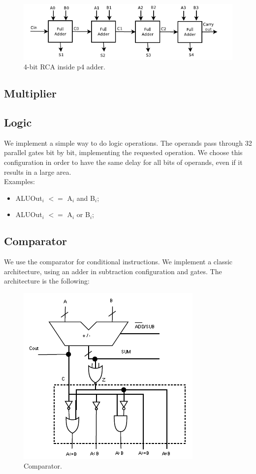 \begin{figure}[h]
\centering
\includegraphics[scale = 0.7]{chapters/figures/rca} 
\caption{4-bit RCA inside p4 adder.}
\label{fig:rca}  %
\end{figure}

\FloatBarrier

\subsection{Multiplier}



\subsection{Logic}

We implement a simple way to do logic operations. The operands pass through 32 parallel gates bit by bit, implementing the requested operation. 
We choose this configuration in order to have the same delay for all bits of operands, even if it results in a large area.
\\Examples: 
\begin{itemize}
\item ALUOut$_{i}$ $<=$ A$_{i}$ and B$_{i}$;
\item ALUOut$_{i}$ $<=$ A$_{i}$ or B$_{i}$;
\end{itemize}

\subsection{Comparator}

We use the comparator for conditional instructions. We implement a classic architecture, using an adder in
subtraction configuration and gates. The architecture is the following:

\begin{figure}[h]
\centering
\includegraphics[scale = 0.5]{chapters/figures/comparator} 
\caption{Comparator.}
\label{fig:comparator}  %
\end{figure}

\FloatBarrier

 